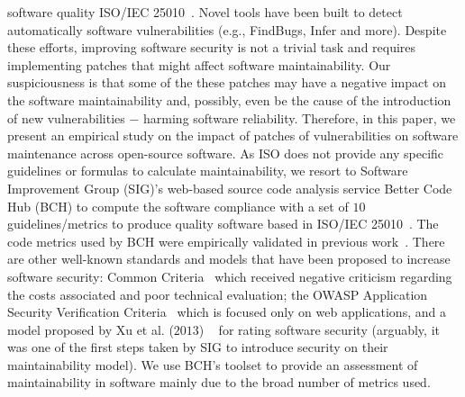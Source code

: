 \documentclass[10pt,conference]{IEEEtran}
\begin{document}
software quality ISO/IEC 25010~\cite{iso:2011}. Novel tools have been built to 
detect automatically software vulnerabilities (e.g., FindBugs, Infer and more). 
%
Despite these efforts, improving software security is not a trivial task and requires 
implementing patches that might affect software maintainability. 
Our suspiciousness is that some of the these patches may have a negative 
impact on the software maintainability and, possibly, even be the cause of the 
introduction of new vulnerabilities $-$ harming software reliability. Therefore, 
in this paper, we present an empirical study on the impact of patches of 
vulnerabilities on software maintenance across open-source software.
%
%
As ISO does not provide any specific guidelines or formulas to calculate 
maintainability, we resort to Software Improvement Group (SIG)'s web-based source 
code analysis service Better Code Hub (BCH) to compute the software compliance 
with a set of $10$ guidelines/metrics to produce quality software 
based in ISO/IEC 25010~\cite{Visser:2016:OREILLY}. The code metrics used by BCH 
were empirically validated in previous work~\cite{Bijlsma:2012:FIR:2317098.2317124, 8530041, cruz2019energyoriented}. 
There are other well-known standards and models that have been proposed
to increase software security: Common Criteria~\cite{common:2009} which received
negative criticism regarding the costs associated and poor technical evaluation;
the OWASP Application Security Verification Criteria~\cite{oswap:2009} which is
focused only on web applications, and a model proposed by Xu et al. ($2013$)
~\cite{6616351} for rating software security (arguably, it was one of the
first steps taken by SIG to introduce security on their maintainability model). 
%
We use BCH's toolset to provide an assessment of maintainability in 
software mainly due to the broad number of metrics used.
\end{document}
